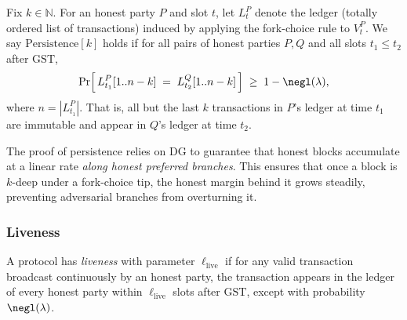 \begin{definition}\label{appdef:persistence}
Fix $k \in \mathbb{N}$. For an honest party $P$ and slot $t$, let $L_t^P$ denote
the ledger (totally ordered list of transactions) induced by applying the fork-choice
rule to $V_t^P$. We say $\mathrm{Persistence}[k]$ holds if for all pairs of honest
parties $P,Q$ and all slots $t_1 \le t_2$ after $\mathrm{GST}$,
\[
\Pr\!\Big[\, L_{t_1}^P[1..n-k] \;=\; L_{t_2}^Q[1..n-k] \,\Big] \;\ge\; 1-\negl(\lambda),
\]
where $n=|L_{t_1}^P|$. That is, all but the last $k$ transactions in $P$'s ledger
at time $t_1$ are immutable and appear in $Q$'s ledger at time $t_2$.
\end{definition}

\begin{remark}
The proof of persistence %
relies on DG 
to guarantee that honest blocks accumulate at a linear rate \emph{along honest preferred branches}. 
This ensures that once a block is $k$-deep under a fork-choice tip, the honest margin behind it 
grows steadily, preventing adversarial branches from overturning it. 
\end{remark}




\subsubsection{Liveness}
\label{app:liveness}



A protocol has \emph{liveness} with parameter $\ell_{\mathrm{live}}$ if for any valid transaction broadcast continuously by an honest party,
the transaction appears in the ledger of every honest party within $\ell_{\mathrm{live}}$ slots after $\mathrm{GST}$,
except with probability $\negl(\lambda)$.



